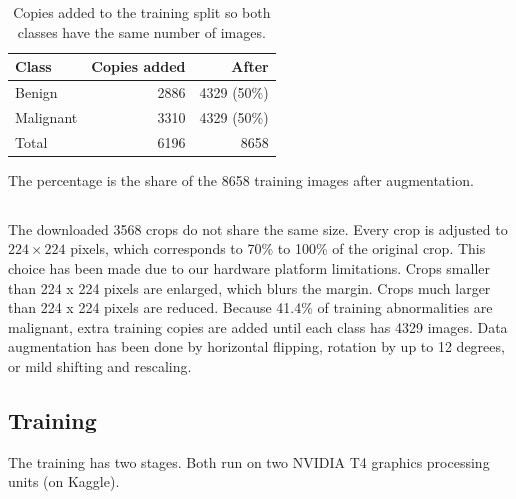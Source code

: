\begin{table}[!t]
\caption{Copies added to the training split so both classes have the same number of images.}
\label{tab:augmentation}
\centering
\footnotesize
\begin{tabular}{@{}lrr@{}}
\toprule
Class & Copies added & After \\
\midrule
Benign & 2886 & 4329 (50\%) \\
Malignant & 3310 & 4329 (50\%) \\
\midrule
Total & 6196 & 8658 \\
\bottomrule
\end{tabular}

\vspace{0.4em}
\begin{minipage}{\columnwidth}
\footnotesize
The percentage is the share of the 8658 training images after augmentation.
\end{minipage}
\end{table}

\subsection{}
\label{sec:resolution}

The downloaded 3568 crops do not share the same size. Every crop is adjusted to $224\times 224$ pixels, which corresponds to 70\% to 100\% of the original crop. This choice has been made due to our hardware platform limitations. Crops smaller than 224 x 224 pixels are enlarged, which blurs the margin. Crops much larger than 224 x 224  pixels are reduced. Because 41.4\% of training abnormalities are malignant, extra training copies are added until each class has 4329 images. Data augmentation has been done by horizontal flipping, rotation by up to 12 degrees, or mild shifting and rescaling.


\subsection{Training}
\label{sec:neural}

The training has two stages. Both run on two NVIDIA T4 graphics processing units (on Kaggle).

